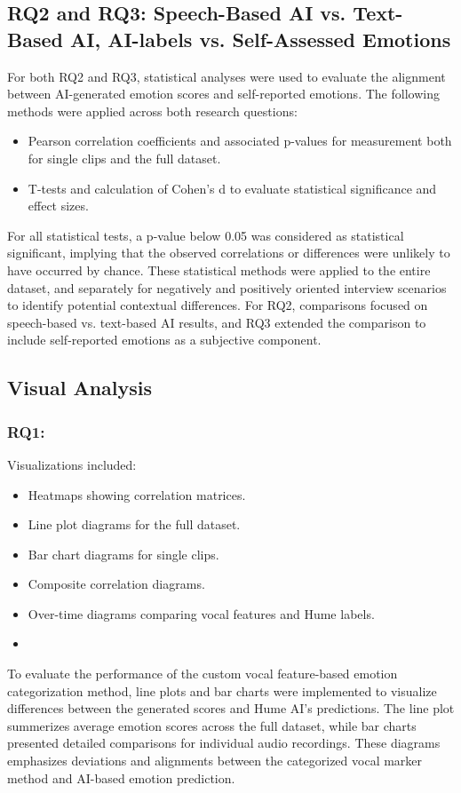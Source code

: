 \subsection{RQ2 and RQ3: Speech-Based AI vs. Text-Based AI, AI-labels vs. Self-Assessed Emotions}
For both RQ2 and RQ3, statistical analyses were used to evaluate the alignment between AI-generated emotion scores and self-reported emotions. The following methods were applied across both research questions:
\begin{itemize}
    \item Pearson correlation coefficients and associated p-values for measurement both for single clips and the full dataset. 
    \item T-tests and calculation of Cohen's d to evaluate statistical significance and effect sizes. 
\end{itemize}
For all statistical tests, a p-value below 0.05 was considered as statistical significant, implying that the observed correlations or differences were unlikely to have occurred by chance. 
These statistical methods were applied to the entire dataset, and separately for negatively and positively oriented interview scenarios to identify potential contextual differences.
For RQ2, comparisons focused on speech-based vs. text-based AI results, and RQ3 extended the comparison to include self-reported emotions as a subjective component.

\subsection{Visual Analysis}
\subsubsection{RQ1:}
Visualizations included: 
\begin{itemize}
    \item Heatmaps showing correlation matrices.
    \item Line plot diagrams for the full dataset. 
    \item Bar chart diagrams for single clips. 
    \item Composite correlation diagrams. 
    \item Over-time diagrams comparing vocal features and Hume labels. 
    \item 
\end{itemize}
To evaluate the performance of the custom vocal feature-based emotion categorization method, line plots and bar charts were implemented to visualize differences between the generated scores and Hume AI's predictions. 
The line plot summerizes average emotion scores across the full dataset, while bar charts presented detailed comparisons for individual audio recordings. 
These diagrams emphasizes deviations and alignments between the categorized vocal marker method and AI-based emotion prediction. 

